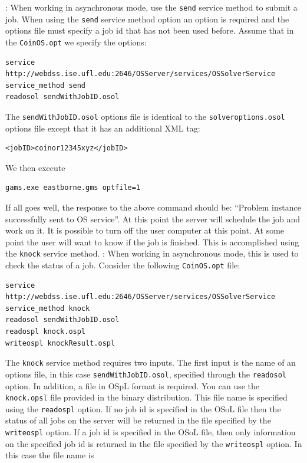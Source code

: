 \documentclass[11pt]{article}
\renewcommand{\_}{{\char"5F}}
\renewcommand{\{}{{\char"7B}}
\renewcommand{\}}{{\char"7D}}
\renewcommand{\^}{{\char"0D}}
\renewcommand{\'}{{\char"0D}}
\begin{document}
\begin{enumerate}[Step 1:]
\vskip 8pt
\noindent {\tt service\_method send}: When working in asynchronous mode, use the {\tt send} service method 
to submit a job. When using  the {\tt send} service method option an option is required and the options file
must specify a  job id that has not been used before.  Assume that in the  {\tt CoinOS.opt}  we specify 
the options:
\vskip 8pt
\begin{verbatim}
service http://webdss.ise.ufl.edu:2646/OSServer/services/OSSolverService
service_method send
readosol sendWithJobID.osol
\end{verbatim}
The {\tt sendWithJobID.osol} options file is identical to the {\tt solveroptions.osol} options file except 
that it has an additional XML tag:
\begin{verbatim}
<jobID>coinor12345xyz</jobID> 
\end{verbatim}
We then execute
\vskip 8pt
\begin{verbatim}
gams.exe eastborne.gms optfile=1
\end{verbatim}
If all goes well, the response to the above command should  be: ``Problem instance successfully sent to 
OS service''. At this point the server will schedule the job and work on it. It is possible to turn off 
the user computer at this point. At some point the user will want to know if the job is finished. 
This is accomplished using the {\tt knock} service method.
\vskip 8pt
\noindent {\tt service\_method knock}: When working in asynchronous mode, this is used to check the status 
of a job.  Consider the following {\tt CoinOS.opt} file:
\vskip 8pt
\begin{verbatim}
service http://webdss.ise.ufl.edu:2646/OSServer/services/OSSolverService
service_method knock
readosol sendWithJobID.osol 
readospl knock.ospl
writeospl knockResult.ospl
\end{verbatim}
The {\tt knock} service method requires two  inputs. The first input is the name of an options file, 
in this case {\tt sendWithJobID.osol}, specified through the {\tt readosol} option. In addition, a file 
in OSpL format is required. You can use the {\tt knock.opsl} file provided in the binary distribution. 
This file name is specified using the {\tt readospl} option. If no job id is specified in the OSoL file 
then the status of all jobs on the server will be returned in the file specified by the {\tt writeospl} 
option. If a job id is specified in the OSoL file, then only information on the specified job id is 
returned in the file specified by the {\tt writeospl} option.  In this case the file name is 

\end{enumerate}
\end{document}
